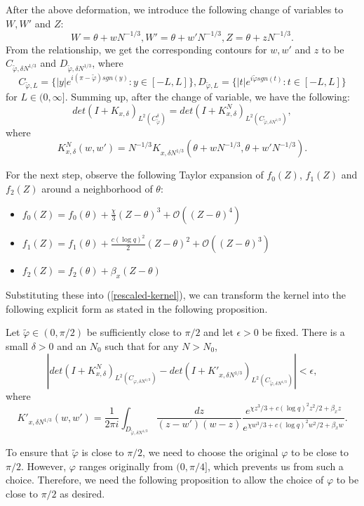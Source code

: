 After the above deformation, we introduce the following change of variables to $W, W'$ and $Z$: $$W = \theta + wN^{-1/3}, W' = \theta + w' N^{-1/3}, Z = \theta + zN^{-1/3}.$$ From the relationship, we get the corresponding contours for $w, w'$ and $z$ to be $C_{\tilde{\varphi},\delta N^{1/3}}$ and $D_{\tilde{\varphi}, \delta N^{1/3}}$, where
$$C_{\tilde{\varphi},L} = \{|y|e^{i(\pi - \tilde{\varphi}) sgn(y)}: y \in [-L, L]\}, D_{\tilde{\varphi}, L} = \{|t| e^{i \tilde{\varphi} sgn(t)}: t \in [-L, L]\}$$ for $L \in (0, \infty].$ Summing up, after the change of variable, we have the following: $$det(I+K_{x, \delta})_{L^2(C_{\tilde{\varphi}}^{\delta})} = det(I +K_{x, \delta}^N )_{L^2(C_{\tilde{\varphi}, \delta N^{1/3}})},$$ where 
\begin{equation}
\label{rescaled-kernel}
K_{x, \delta}^N(w,w') = N^{-1/3} K_{x, \delta N^{1/3}} (\theta + wN^{-1/3}, \theta + w'N^{-1/3}).
\end{equation}

For the next step, observe the following Taylor expansion of $f_0(Z)$, $f_1(Z)$ and $f_2(Z)$ around a neighborhood of $\theta$:
\begin{itemize}
\item $f_0(Z) = f_0(\theta) + \frac{\chi}{3} (Z - \theta)^3 + \mathcal{O}((Z - \theta)^4)$
\item $f_1(Z) = f_1(\theta) + \frac{c(\log q)^2}{2} (Z - \theta)^2 + \mathcal{O}((Z - \theta)^3)$
\item $f_2(Z) = f_2(\theta) + \beta_x (Z - \theta)$
\end{itemize}
Substituting these into (\ref{rescaled-kernel}), we can transform the kernel into the following explicit form as stated in the following proposition.

\begin{proposition} 
Let $\tilde{\varphi} \in (0, \pi / 2)$ be sufficiently close to $\pi / 2$ and let $\epsilon > 0$ be fixed. There is a small $\delta > 0$ and an $N_0$ such that for any $N > N_0$, $$|det(I +K_{x, \delta}^N )_{L^2(C_{\varphi, \delta N^{1/3}})} - det(I + K'_{x, \delta N^{1/3}})_{L^2(C_{\tilde{\varphi}, \delta N^{1/3}})}| < \epsilon,$$ where $$K'_{x,\delta N^{1/3}}(w,w') = \frac{1}{2 \pi i} \int_{D_{\tilde{\varphi}, \delta N^{1/3}}} \frac{dz}{(z-w')(w-z)} \frac{e^{\chi z^3 / 3 + c (\log q)^2 z^2 / 2 + \beta_x z}}{e^{\chi w^3 / 3 + c (\log q)^2 w^2 / 2 + \beta_x w}}.$$
\end{proposition}

To ensure that $\tilde{\varphi}$ is close to $\pi / 2$, we need to choose the original $\varphi$ to be close to $\pi / 2$. However, $\varphi$ ranges originally from $(0, \pi / 4]$, which prevents us from such a choice. Therefore, we need the following proposition to allow the choice of $\varphi$ to be close to $\pi / 2$ as desired. 

